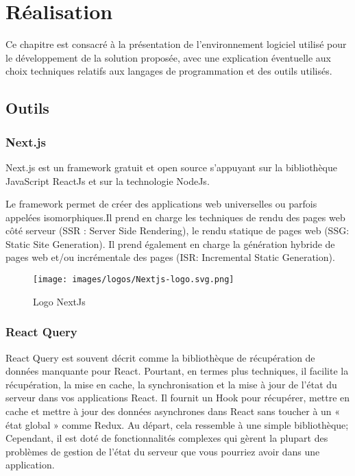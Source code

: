 \chapter{Réalisation}
Ce chapitre est consacré à la présentation de l’environnement logiciel utilisé pour le développement de la solution proposée, avec une explication éventuelle aux choix techniques relatifs aux langages de programmation et des outils utilisés.
\newpage
\section{Outils}
\subsection{Next.js}
Next.js est un framework gratuit et open source s'appuyant sur la bibliothèque JavaScript ReactJs et sur la technologie NodeJs.

Le framework permet de créer des applications web universelles ou parfois appelées isomorphiques.Il prend en charge les techniques de rendu des pages web côté serveur (SSR : Server Side Rendering), le rendu statique de pages web (SSG: Static Site Generation). Il prend également en charge la génération hybride de pages web et/ou incrémentale des pages (ISR: Incremental Static Generation).

\begin{figure}[!h]
\begin{center}
\texttt{[image: images/logos/Nextjs-logo.svg.png]}
\end{center}
\caption{Logo NextJs}
\end{figure}

\subsection{React Query}
React Query est souvent décrit comme la bibliothèque de récupération de données manquante pour React. Pourtant, en termes plus techniques, il facilite la récupération, la mise en cache, la synchronisation et la mise à jour de l’état du serveur dans vos applications React. Il fournit un Hook pour récupérer, mettre en cache et mettre à jour des données asynchrones dans React sans toucher à un « état global » comme Redux. Au départ, cela ressemble à une simple bibliothèque; Cependant, il est doté de fonctionnalités complexes qui gèrent la plupart des problèmes de gestion de l’état du serveur que vous pourriez avoir dans une application.\cite{reactQuery}

